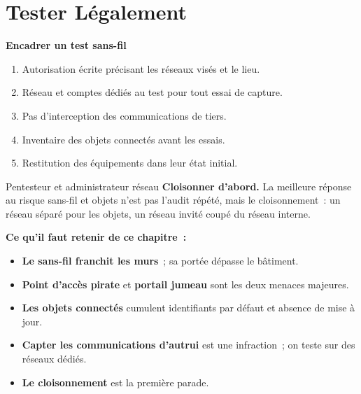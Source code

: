 \section{Tester Légalement}
\label{sec:c18-legal}

\begin{boxprocedure}
\textbf{Encadrer un test sans-fil}
\begin{enumerate}
    \item Autorisation écrite précisant les réseaux visés et le lieu.
    \item Réseau et comptes dédiés au test pour tout essai de capture.
    \item Pas d'interception des communications de tiers.
    \item Inventaire des objets connectés avant les essais.
    \item Restitution des équipements dans leur état initial.
\end{enumerate}
\end{boxprocedure}

\begin{boxmetier}{Pentesteur et administrateur réseau}
\textbf{Cloisonner d'abord.} La meilleure réponse au risque sans-fil et
objets n'est pas l'audit répété, mais le cloisonnement~: un réseau séparé
pour les objets, un réseau invité coupé du réseau interne.
\end{boxmetier}

\separateur

\begin{boxresume}
\textbf{Ce qu'il faut retenir de ce chapitre~:}
\begin{itemize}
    \item \textbf{Le sans-fil franchit les murs}~; sa portée dépasse le
          bâtiment.
    \item \textbf{Point d'accès pirate} et \textbf{portail jumeau} sont les
          deux menaces majeures.
    \item \textbf{Les objets connectés} cumulent identifiants par défaut et
          absence de mise à jour.
    \item \textbf{Capter les communications d'autrui} est une infraction~;
          on teste sur des réseaux dédiés.
    \item \textbf{Le cloisonnement} est la première parade.
\end{itemize}
\end{boxresume}

